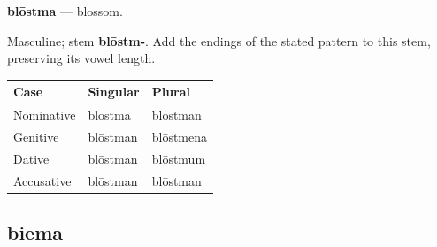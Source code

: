 \par\begin{minipage}{\linewidth}\raggedright
\textbf{blōstma} — blossom.

Masculine; stem \textbf{blōstm-}. Add the endings of the stated pattern to this stem, preserving its vowel length.

\par\begingroup
\fontsize{10.5}{13.2}\selectfont
\setlength{\LTleft}{0pt}\setlength{\LTright}{\fill}
\noindent
\begin{tabular}{@{}>{\raggedright\arraybackslash}p{39.46mm}>{\raggedright\arraybackslash}p{39.46mm}>{\raggedright\arraybackslash}p{39.46mm}@{}}
\toprule
\textbf{Case} & \textbf{Singular} & \textbf{Plural} \\
\midrule
Nominative & blōstma & blōstman \\
Genitive & blōstman & blōstmena \\
Dative & blōstman & blōstmum \\
Accusative & blōstman & blōstman \\
\bottomrule
\end{tabular}
\par\endgroup

\end{minipage}\par
{}
\subsection*{biema}

